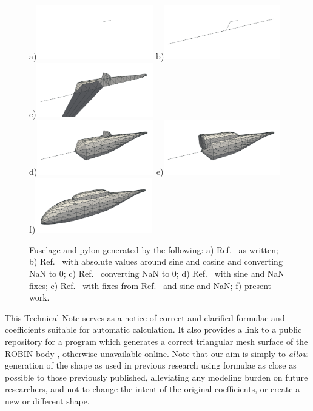 \documentclass[journal]{new-aiaa}
\begin{document}
\begin{figure}[b]
\begin{centering}
a)\includegraphics[width=2.0in]{img_figa.png}
b)\includegraphics[width=2.0in]{img_figc.png}
c)\includegraphics[width=2.0in]{img_figd.png} \\
d)\includegraphics[width=2.0in]{img_fige.png}
e)\includegraphics[width=2.0in]{img_figf.png}
f)\includegraphics[width=2.0in]{img_figg.png}
\caption{Fuselage and pylon generated by the following: a) Ref.~\cite{nasa80051} as written; b) Ref.~\cite{nasa80051} with absolute values around sine and cosine and converting NaN to 0; c) Ref.~\cite{nasa87762} converting NaN to 0; d) Ref.~\cite{nasa87762} with sine and NaN fixes; e) Ref.~\cite{mineckgorton} with fixes from Ref.~\cite{nasa87762} and sine and NaN; f) present work.}
\label{allforms}
\end{centering}\end{figure}%
This Technical Note serves as a notice of correct and clarified formulae and coefficients
suitable for automatic calculation.
It also provides a link to a public repository for a program which generates a correct
triangular mesh surface of the ROBIN body \cite{robinsurfmesh}, otherwise unavailable online.
Note that our aim is simply to \emph{allow} generation of the shape as used in previous research
using formulae as close as possible to those previously published,
alleviating any modeling burden on future researchers,
and not to change the intent of the original coefficients, or create a new or different shape.
\end{document}
